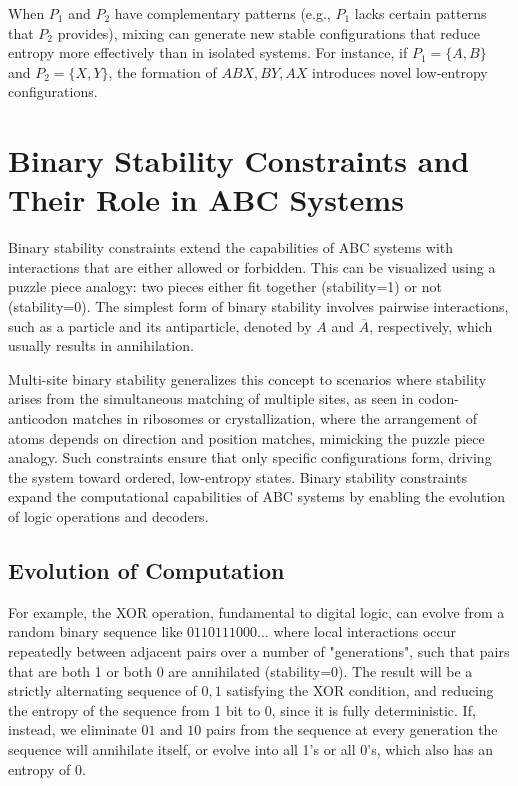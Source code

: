 \documentclass[entropy,article,submit,pdftex,moreauthors]{Definitions/mdpi}
\begin{document}
When \( P_1 \) and \( P_2 \) have complementary patterns (e.g., \( P_1 \) lacks certain patterns that \( P_2 \) provides), mixing can generate new stable configurations that reduce entropy more effectively than in isolated systems. For instance, if \( P_1 = \{A, B\} \) and \( P_2 = \{X, Y\} \), the formation of \( ABX, BY, AX \) introduces novel low-entropy configurations.

\section{Binary Stability Constraints and Their Role in ABC Systems}

Binary stability constraints extend the capabilities of ABC systems with interactions that are either allowed or forbidden. This can be visualized using a puzzle piece analogy: two pieces either fit together (stability=1) or not (stability=0). The simplest form of binary stability involves pairwise interactions, such as a particle and its antiparticle, denoted by \( A \) and \( \overline{A} \), respectively, which usually results in annihilation. 

Multi-site binary stability generalizes this concept to scenarios where stability arises from the simultaneous matching of multiple sites, as seen in codon-anticodon matches in ribosomes or crystallization, where the arrangement of atoms depends on direction and position matches, mimicking the puzzle piece analogy. Such constraints ensure that only specific configurations form, driving the system toward ordered, low-entropy states. Binary stability constraints expand the computational capabilities of ABC systems by enabling the evolution of logic operations and decoders. 

\subsection{Evolution of Computation}

For example, the XOR operation, fundamental to digital logic, can evolve from a random binary sequence  like \( 0110111000\dots \) where local interactions occur repeatedly between adjacent pairs over a number of "generations", such that pairs that are both 1 or both 0 are annihilated (stability=0). The result will be a strictly alternating sequence of \( 0, 1 \) satisfying the XOR condition, and reducing the entropy of the sequence from 1 bit to 0, since it is fully deterministic. If, instead, we eliminate \( 01 \) and \( 10 \) pairs from the sequence at every generation the sequence will annihilate itself, or evolve into all 1's or all 0's, which also has an entropy of 0.
\end{document}
